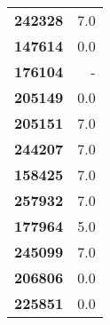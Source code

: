 \documentclass[11pt]{article}
\begin{document}
\begin{center}
\begin{longtable}{lr}
\textbf{242328} &                      7.0 \\
\textbf{147614} &                      0.0 \\
\textbf{176104} &                        - \\
\textbf{205149} &                      0.0 \\
\textbf{205151} &                      7.0 \\
\textbf{244207} &                      7.0 \\
\textbf{158425} &                      7.0 \\
\textbf{257932} &                      7.0 \\
\textbf{177964} &                      5.0 \\
\textbf{245099} &                      7.0 \\
\textbf{206806} &                      0.0 \\
\textbf{225851} &                      0.0 \\
\end{longtable}
\end{center}
\end{document}
